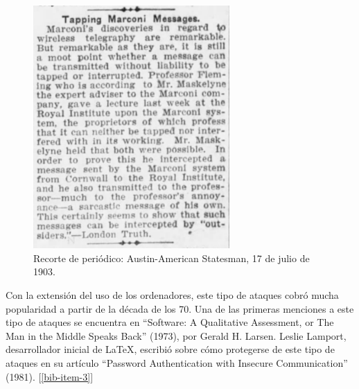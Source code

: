 \documentclass[11pt]{article}
\begin{document}
\begin{figure}[H]
	\centering
	\includegraphics[width=75mm]{images/memoir/marconi-paper}
	\caption{Recorte de periódico: Austin-American Statesman, 17 de julio de 1903.}
\end{figure}

Con la extensión del uso de los ordenadores, este tipo de ataques cobró mucha popularidad a partir de la década de los 70. Una de las
primeras menciones a este tipo de ataques se encuentra en ``Software: A Qualitative Assessment, or The Man in the Middle Speaks Back'' (1973), por
Gerald H. Larsen. Leslie Lamport, desarrollador inicial de \LaTeX, escribió sobre cómo protegerse de este tipo de ataques en su artículo
``Password Authentication with Insecure Communication'' (1981). [\ref{bib-item-3}]
\end{document}
